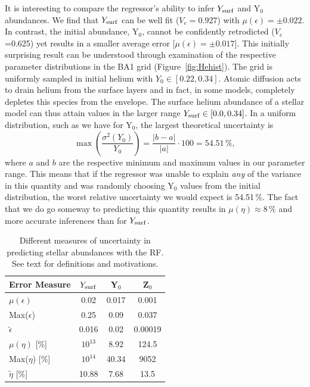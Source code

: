 It is interesting to compare the regressor's ability to infer $Y_{\rm{surf}}$ and Y$_0$ abundances. We find that  $Y_{\rm{surf}}$ can be well fit ($V_e = 0.927$) with $\mu (\epsilon) = \pm 0.022$. In contrast, the initial abundance, Y$_0$, cannot be confidently retrodicted  ($V_e$=0.625) yet results in a smaller average error [$\mu (\epsilon) = \pm 0.017$]. 
This initially surprising result can be understood through examination of the respective parameter distributions in the BA1 grid (Figure~\ref{fig:Hehist}).
The grid is uniformly sampled in initial helium with $Y_0 \in [0.22, 0.34]$. 
Atomic diffusion acts to drain helium from the surface layers and in fact, in some models, completely depletes this species from the envelope. 
The surface helium abundance of a stellar model can thus attain values in the larger range
$Y_{\rm{surf}} \in [0.0, 0.34]$.  %
In a  uniform distribution, such as we have for Y$_0$, the largest theoretical uncertainty  is 
\begin{equation}
    \max \left( \frac{\sigma^2(Y_0)}{Y_0} \right) = \frac{|b-a|}{|a|} \cdot 100 = 54.51\,\%,
\end{equation}
where $a$ and $b$ are the respective minimum and maximum values in our parameter range.  
This means that if the regressor was unable to explain \emph{any} of the variance in this quantity and was randomly choosing Y$_0$ values from the initial distribution, the worst relative uncertainty we would expect is 54.51\,\%. The fact that we do go someway to predicting this quantity results in $\mu (\eta) \approx 8\,\% $ and more accurate inferences than for $Y_{\rm{surf}}$. 






\begin{table}
\centering
\caption{Different measures of uncertainty in predicting stellar abundances with the RF. See text for definitions and motivations.}
    \begin{tabular}{lccc}
 \hline \hline
 Error Measure& $Y_{\rm{surf}}$ & Y$_0$ & Z$_0$ \\ \hline
 $\mu (\epsilon)$                 & 0.02 &0.017 & 0.001 \\
 Max($\epsilon$)             & 0.25 &0.09   & 0.037\\    
$\tilde {\epsilon}$          & 0.016  &0.02     &0.00019\\
$\mu (\eta)$ [\%]       & $10^{13}$ &8.92& 124.5 \\ 
  Max($\eta$) [\%]   & $10^{14}$ &40.34  & 9052 \\
$\tilde {\eta}$  [\%] & 10.88 &7.68  & 13.5 \\
\hline
\end{tabular}
\label{tab:relabunds}
\end{table}


